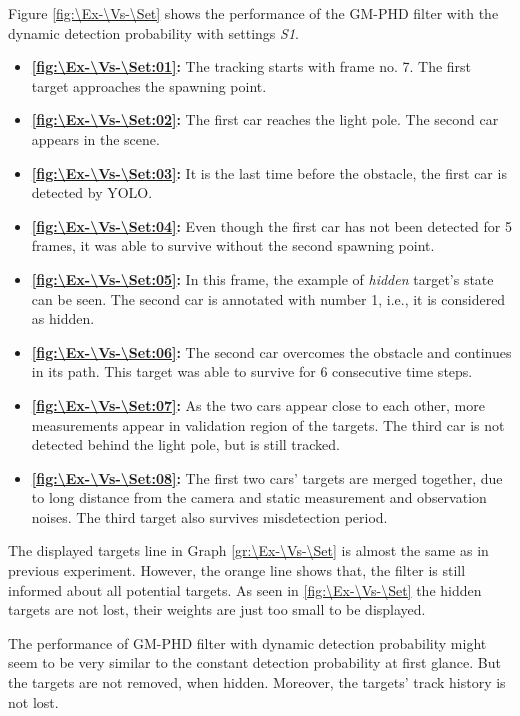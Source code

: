 Figure \ref{fig:\Ex-\Vs-\Set} shows the performance of the GM-PHD filter with the dynamic detection probability with settings \textit{S1}.
\begin{itemize}
    \item \textbf{\ref{fig:\Ex-\Vs-\Set:01}:} The tracking starts with frame no. 7. The first target approaches the spawning point.
    \item \textbf{\ref{fig:\Ex-\Vs-\Set:02}:} The first car reaches the light pole. The second car appears in the scene.
    \item \textbf{\ref{fig:\Ex-\Vs-\Set:03}:} It is the last time before the obstacle, the first car is detected by YOLO.
    \item \textbf{\ref{fig:\Ex-\Vs-\Set:04}:} Even though the first car has not been detected for 5 frames, it was able to survive without the second spawning point.
    \item \textbf{\ref{fig:\Ex-\Vs-\Set:05}:} In this frame, the example of \textit{hidden} target's state can be seen. The second car is annotated with number 1, i.e., it is considered as hidden.
    \item \textbf{\ref{fig:\Ex-\Vs-\Set:06}:} The second car overcomes the obstacle and continues in its path. This target was able to survive for 6 consecutive time steps.
    \item \textbf{\ref{fig:\Ex-\Vs-\Set:07}:} As the two cars appear close to each other, more measurements appear in validation region of the targets. The third car is not detected behind the light pole, but is still tracked.
    \item \textbf{\ref{fig:\Ex-\Vs-\Set:08}:} The first two cars' targets are merged together, due to long distance from the camera and static measurement and observation noises. The third target also survives misdetection period.
\end{itemize}

The displayed targets line in Graph \ref{gr:\Ex-\Vs-\Set} is almost the same as in previous experiment. However, the orange line shows that, the filter is still informed about all potential targets. As seen in \ref{fig:\Ex-\Vs-\Set} the hidden targets are not lost, their weights are just too small to be displayed.

The performance of GM-PHD filter with dynamic detection probability might seem to be very similar to the constant detection probability at first glance. But the targets are not removed, when hidden. Moreover, the targets' track history is not lost.

